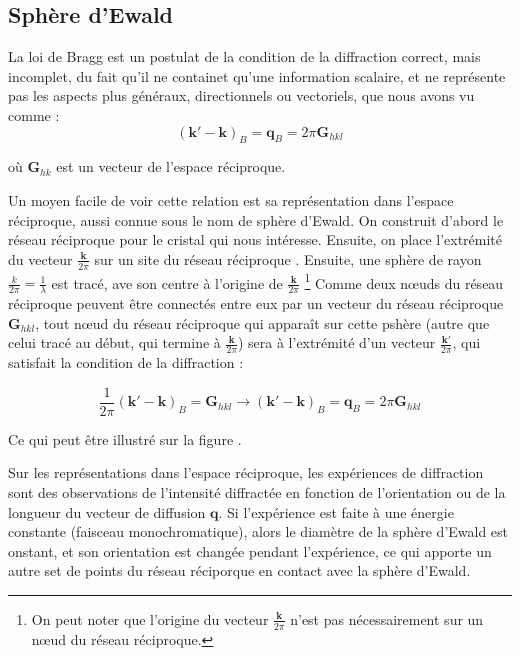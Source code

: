 \subsection{Sphère d'Ewald}

La loi de Bragg est un postulat de la condition de la diffraction correct, mais
incomplet, du fait qu'il ne containet qu'une information scalaire, et ne
représente pas les aspects plus généraux, directionnels ou vectoriels, que nous
avons vu comme :
\begin{equation}
    (\mathbf{k'-k})_B = \mathbf{q}_B = 2\pi \mathbf{G}_{hkl}
\end{equation}

où $\mathbf{G}_{hk}$ est un vecteur de l'espace réciproque.

Un moyen facile de voir cette relation est sa représentation dans l'espace
réciproque, aussi connue sous le nom de sphère d'Ewald. On construit d'abord le
réseau réciproque pour le cristal qui nous intéresse. Ensuite, on place
l'extrémité du vecteur $\frac{\mathbf{k}}{2\pi}$ sur un site du réseau réciproque
. Ensuite, une sphère de rayon $\frac{k}{2\pi} = \frac{1}{\lambda}$ est tracé,
ave son centre à l'origine de $\frac{\mathbf{k}}{2\pi}$
\footnote{On peut noter que l'origine du vecteur $\frac{\mathbf{k}}{2\pi}$ n'est
pas nécessairement sur un nœud du réseau réciproque.}
Comme deux nœuds du réseau réciproque peuvent être connectés entre eux par un
vecteur du réseau réciproque $\mathbf{G}_{hkl}$, tout nœud du réseau réciproque
qui apparaît sur cette pshère (autre que celui tracé au début, qui termine à
$\frac{\mathbf{k}}{2\pi}$) sera à l'extrémité d'un vecteur
$\frac{\mathbf{k'}}{2\pi}$, qui satisfait la condition de la diffraction :

\begin{equation}
    \frac{1}{2\pi} (\mathbf{k'-k})_B = \mathbf{G}_{hkl} \rightarrow
    (\mathbf{k'-k})_B = \mathbf{q}_B = 2 \pi \mathbf{G}_{hkl}
\end{equation}

Ce qui peut être illustré sur la figure \TODO.

Sur les représentations dans l'espace réciproque, les expériences de diffraction 
sont des observations de l'intensité diffractée en fonction de l'orientation
ou de la longueur du vecteur de diffusion $\mathbf{q}$. Si l'expérience est faite
à une énergie constante (faisceau monochromatique), alors le diamètre de la
sphère d'Ewald est onstant, et son orientation est changée pendant l'expérience,
ce qui apporte un autre set de points du réseau réciporque en contact avec la
sphère d'Ewald.

